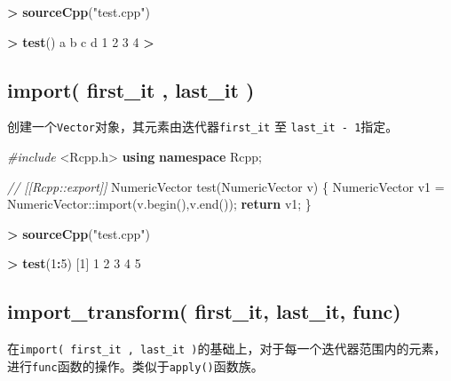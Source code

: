 \documentclass[]{ctexbook}
\newenvironment{Shaded}{\begin{snugshade}}{\end{snugshade}}
\newcommand{\KeywordTok}[1]{\textcolor[rgb]{0.13,0.29,0.53}{\textbf{#1}}}
\newcommand{\DecValTok}[1]{\textcolor[rgb]{0.00,0.00,0.81}{#1}}
\newcommand{\StringTok}[1]{\textcolor[rgb]{0.31,0.60,0.02}{#1}}
\newcommand{\ImportTok}[1]{#1}
\newcommand{\CommentTok}[1]{\textcolor[rgb]{0.56,0.35,0.01}{\textit{#1}}}
\newcommand{\ControlFlowTok}[1]{\textcolor[rgb]{0.13,0.29,0.53}{\textbf{#1}}}
\newcommand{\OperatorTok}[1]{\textcolor[rgb]{0.81,0.36,0.00}{\textbf{#1}}}
\newcommand{\PreprocessorTok}[1]{\textcolor[rgb]{0.56,0.35,0.01}{\textit{#1}}}
\newcommand{\NormalTok}[1]{#1}
\begin{document}
\begin{Shaded}
\begin{Highlighting}[]
\OperatorTok{>}\StringTok{ }\KeywordTok{sourceCpp}\NormalTok{(}\StringTok{"test.cpp"}\NormalTok{)}

\OperatorTok{>}\StringTok{ }\KeywordTok{test}\NormalTok{()}
\NormalTok{a b c d }
\DecValTok{1} \DecValTok{2} \DecValTok{3} \DecValTok{4} 
\OperatorTok{>}\StringTok{ }
\end{Highlighting}
\end{Shaded}

\subsection{import( first\_it , last\_it )}\label{import}

创建一个\texttt{Vector}对象，其元素由迭代器\texttt{first\_it} 至
\texttt{last\_it\ -\ 1}指定。

\begin{Shaded}
\begin{Highlighting}[]
\PreprocessorTok{#include }\ImportTok{<Rcpp.h>}
\KeywordTok{using} \KeywordTok{namespace}\NormalTok{ Rcpp;}

\CommentTok{// [[Rcpp::export]]}
\NormalTok{NumericVector test(NumericVector v) \{}
\NormalTok{    NumericVector v1 = NumericVector::import(v.begin(),v.end());}
  \ControlFlowTok{return}\NormalTok{ v1;}
\NormalTok{\}}
\end{Highlighting}
\end{Shaded}

\begin{Shaded}
\begin{Highlighting}[]
\OperatorTok{>}\StringTok{ }\KeywordTok{sourceCpp}\NormalTok{(}\StringTok{"test.cpp"}\NormalTok{)}

\OperatorTok{>}\StringTok{ }\KeywordTok{test}\NormalTok{(}\DecValTok{1}\OperatorTok{:}\DecValTok{5}\NormalTok{)}
\NormalTok{[}\DecValTok{1}\NormalTok{] }\DecValTok{1} \DecValTok{2} \DecValTok{3} \DecValTok{4} \DecValTok{5}
\end{Highlighting}
\end{Shaded}

\subsection{import\_transform( first\_it, last\_it,
func)}\label{import_transform}

在\texttt{import(\ first\_it\ ,\ last\_it\ )}的基础上，对于每一个迭代器范围内的元素，进行\texttt{func}函数的操作。类似于\texttt{apply()}函数族。
\end{document}
